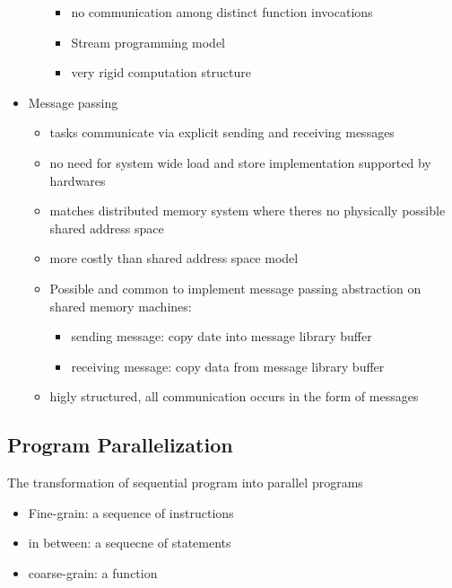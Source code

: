 \documentclass{article}
\begin{document}
\begin{itemize}
\begin{itemize}
\begin{itemize}
            \item no communication among distinct function invocations
            \item Stream programming model
            \item very rigid computation structure
        \end{itemize}
    \end{itemize}
    \item Message passing 
    \begin{itemize}
        \item tasks communicate via explicit sending and receiving messages
        \item no need for system wide load and store implementation supported by hardwares
        \item matches distributed memory system where theres no physically possible shared address space
        \item more costly than shared address space model
        \item Possible and common to implement message passing abstraction on shared memory machines:
        \begin{itemize}
            \item sending message: copy date into message library buffer
            \item receiving message: copy data from message library buffer 
        \end{itemize}
        \item higly structured, all communication occurs in the form of messages
    \end{itemize}
\end{itemize}
\subsection{Program Parallelization}
The transformation of sequential program into parallel programs
\begin{itemize}
    \item Fine-grain: a sequence of instructions
    \item in between: a sequecne of statements 
    \item coarse-grain: a function 
\end{itemize}
\end{document}
